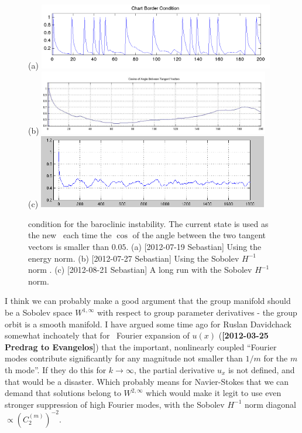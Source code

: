 \begin{description}
\begin{figure}
(a) \includegraphics[width=0.92\textwidth]{ChartBorder2}
    \\
(b) \includegraphics[width=0.9\textwidth]{ChartBorder3}
    \\
(c) \includegraphics[width=0.9\textwidth]{ChartBorder4}
  \caption{{\ChartBord} condition for the baroclinic
  instability. The current state is used as the new \template\
  each time the $\cos$ of the angle between the two tangent vectors
  \refeq{chartBordAng} is smaller than $0.05$.
(a) [2012-07-19 Sebastian] Using the energy norm.
(b) [2012-07-27 Sebastian] Using the Sobolev $H^{-1}$ norm  .
(c) [2012-08-21 Sebastian] A long run with the Sobolev $H^{-1}$ norm.
}\label{ChartBorder2}
\end{figure}


\item[2012-07-26 Predrag] I think we can probably make a good argument
that the group manifold should be a
{Sobolev space} $W^{1,\infty}$ with respect to group parameter
derivatives - the group orbit is a smooth manifold. I have argued some
time ago for Ruslan Davidchack somewhat inchoately that for \KS\ Fourier
expansion of $u(x)$ ({\bf [2012-03-25 Predrag to Evangelos]}) that the
important, nonlinearly coupled ``Fourier modes contribute significantly
for any magnitude not smaller than $1/m$ for the $m$th mode''. If they do
this for $k \to \infty$, the partial derivative $u_x$ is not defined, and
that would be a disaster. Which probably means for Navier-Stokes that we
can demand that solutions belong to $W^{2,\infty}$ which would make it
legit to use even stronger suppression of high Fourier modes, with the
Sobolev $H^{-1}$ norm diagonal $\propto (C_2^{(m)})^{-2}$.


\end{description}

